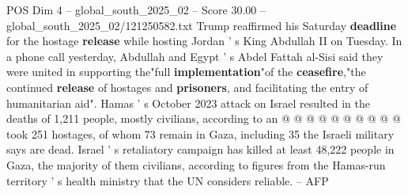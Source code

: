 \begin{textsample}{POS Dim 4 – global\_south\_2025\_02 – Score 30.00 – global\_south\_2025\_02/121250582.txt}
Trump reaffirmed his Saturday \textbf{deadline} for the hostage \textbf{release} while hosting Jordan ' s King Abdullah II on Tuesday.
In a phone call yesterday, Abdullah and Egypt ' s Abdel Fattah al-Sisi said they were united in supporting the"full \textbf{implementation}"of the \textbf{ceasefire},"the continued \textbf{release} of hostages and \textbf{prisoners}, and facilitating the entry of humanitarian aid".
Hamas ' s October 2023 attack on Israel resulted in the deaths of 1,211 people, mostly civilians, according to an @ @ @ @ @ @ @ @ @ @ took 251 hostages, of whom 73 remain in Gaza, including 35 the Israeli military says are dead.
Israel ' s retaliatory campaign has killed at least 48,222 people in Gaza, the majority of them civilians, according to figures from the Hamas-run territory ' s health ministry that the UN considers reliable. -- AFP

\end{textsample}
